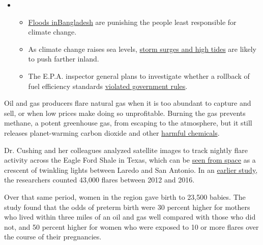 \begin{itemize}
\item
  \begin{itemize}
  \tightlist
  \item
    \href{https://www.nytimes3xbfgragh.onion/2020/07/30/climate/bangladesh-floods.html?action=click\&pgtype=Article\&state=default\&region=MAIN_CONTENT_1\&context=storylines_keepup}{Floods
    in}\href{https://www.nytimes3xbfgragh.onion/2020/07/30/climate/bangladesh-floods.html?action=click\&pgtype=Article\&state=default\&region=MAIN_CONTENT_1\&context=storylines_keepup}{Bangladesh}
    are punishing the people least responsible for climate change.
  \item
    As climate change raises sea levels,
    \href{https://www.nytimes3xbfgragh.onion/2020/07/30/climate/sea-level-inland-floods.html?action=click\&pgtype=Article\&state=default\&region=MAIN_CONTENT_1\&context=storylines_keepup}{storm
    surges and high tides} are likely to push farther inland.
  \item
    The E.P.A. inspector general plans to investigate whether a rollback
    of fuel efficiency standards
    \href{https://www.nytimes3xbfgragh.onion/2020/07/27/climate/trump-fuel-efficiency-rule.html?action=click\&pgtype=Article\&state=default\&region=MAIN_CONTENT_1\&context=storylines_keepup}{violated
    government rules}.
  \end{itemize}
\end{itemize}

Oil and gas producers flare natural gas when it is too abundant to
capture and sell, or when low prices make doing so unprofitable. Burning
the gas prevents methane, a potent greenhouse gas, from escaping to the
atmosphere, but it still releases planet-warming carbon dioxide and
other
\href{https://www.nytimes3xbfgragh.onion/2020/07/16/world/middleeast/iraq-gas-flaring-cancer-environment.html}{harmful
chemicals}.

Dr. Cushing and her colleagues analyzed satellite images to track
nightly flare activity across the Eagle Ford Shale in Texas, which can
be
\href{https://earthobservatory.nasa.gov/images/87725/shale-revolution-as-clear-as-night-and-day}{seen
from space} as a crescent of twinkling lights between Laredo and San
Antonio. In an
\href{https://pubs.acs.org/doi/abs/10.1021/acs.est.8b05355}{earlier
study}, the researchers counted 43,000 flares between 2012 and 2016.

Over that same period, women in the region gave birth to 23,500 babies.
The study found that the odds of preterm birth were 30 percent higher
for mothers who lived within three miles of an oil and gas well compared
with those who did not, and 50 percent higher for women who were exposed
to 10 or more flares over the course of their pregnancies.

